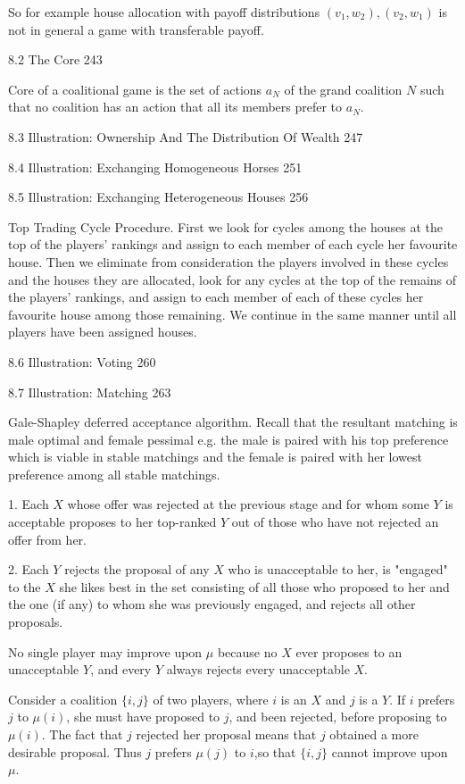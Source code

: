 So for example house allocation with payoff distributions $(v_1,w_2),(v_2,w_1)$ is not in general a game with transferable payoff.

8.2 The Core 243

Core of a coalitional game is the set of actions $a_N$ of the grand coalition $N$ such that no coalition has an action that all its members prefer to $a_N$.

8.3 Illustration: Ownership And The Distribution Of Wealth 247



8.4 Illustration: Exchanging Homogeneous Horses 251



8.5 Illustration: Exchanging Heterogeneous Houses 256

Top Trading Cycle Procedure. First we look for cycles among the houses at the top of the players' rankings and assign to each member of each cycle her favourite house. Then we eliminate from consideration the players involved in these cycles and the houses they are allocated, look for any cycles at the top of the remains of the players' rankings, and assign to each member of each of these cycles her favourite house among those remaining. We continue in the same manner until all players have been assigned houses.

8.6 Illustration: Voting 260



8.7 Illustration: Matching 263

Gale-Shapley deferred acceptance algorithm. Recall that the resultant matching is male optimal and female pessimal e.g. the male is paired with his top preference which is viable in stable matchings and the female is paired with her lowest preference among all stable matchings.

1. Each $X$ whose offer was rejected at the previous stage and for whom some $Y$ is acceptable proposes to her top-ranked $Y$ out of those who have not rejected an offer from her.

2. Each $Y$ rejects the proposal of any $X$ who is unacceptable to her, is "engaged" to the $X$ she likes best in the set consisting of all those who proposed to her and the one (if any) to whom she was previously engaged, and rejects all other proposals.

No single player may improve upon $\mu$ because no $X$ ever proposes to an unacceptable $Y$, and every $Y$ always rejects every unacceptable $X$.

Consider a coalition $\{i,j\}$ of two players, where $i$ is an $X$ and $j$ is a $Y$. If $i$ prefers $j$ to $\mu(i)$, she must have proposed to $j$, and been rejected, before proposing to $\mu(i)$. The fact that $j$ rejected her proposal means that $j$ obtained a more desirable proposal. Thus $j$ prefers $\mu(j)$ to $i$,so that $\{i,j\}$ cannot improve upon $\mu$.

